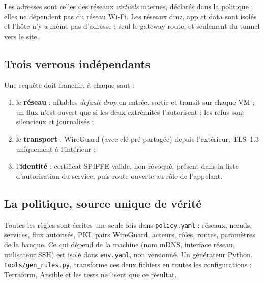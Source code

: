 \documentclass[11pt,a4paper]{article}
\newcommand{\cmd}[1]{\texttt{#1}}
\begin{document}
Les adresses sont celles des réseaux \emph{virtuels} internes, déclarés dans la politique ; elles
ne dépendent pas du réseau Wi-Fi. Les réseaux dmz, app et data sont isolés et l'hôte n'y a même
pas d'adresse ; seul le gateway route, et seulement du tunnel vers le site.

\subsection{Trois verrous indépendants}
Une requête doit franchir, à chaque saut :
\begin{enumerate}
  \item le \textbf{réseau} : nftables \emph{default drop} en entrée, sortie et transit sur chaque VM ;
        un flux n'est ouvert que si les deux extrémités l'autorisent ; les refus sont silencieux et journalisés ;
  \item le \textbf{transport} : WireGuard (avec clé pré-partagée) depuis l'extérieur, TLS~1.3 uniquement à l'intérieur ;
  \item l'\textbf{identité} : certificat SPIFFE valide, non révoqué, présent dans la liste
        d'autorisation du service, puis route ouverte au rôle de l'appelant.
\end{enumerate}

\subsection{La politique, source unique de vérité}
Toutes les règles sont écrites une seule fois dans \cmd{policy.yaml} : réseaux, nœuds, services,
flux autorisés, PKI, pairs WireGuard, acteurs, rôles, routes, paramètres de la banque. Ce qui
dépend de la machine (nom mDNS, interface réseau, utilisateur SSH) est isolé dans \cmd{env.yaml},
non versionné. Un générateur Python, \cmd{tools/gen\_rules.py}, transforme ces deux fichiers en
toutes les configurations ; Terraform, Ansible et les tests ne lisent que ce résultat.
\end{document}

